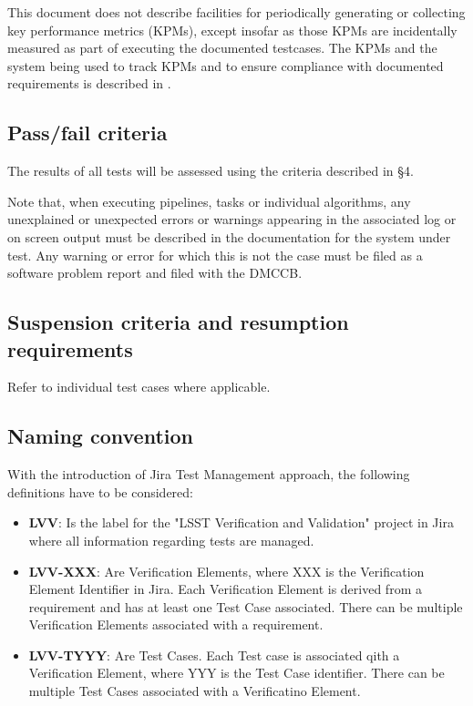 \documentclass[DM,lsstdraft,STS,toc]{lsstdoc}
\begin{document}
This document does not describe facilities for periodically generating or
collecting key performance metrics (KPMs), except insofar as those KPMs are
incidentally measured as part of executing the documented testcases. The KPMs
and the system being used to track KPMs and to ensure compliance with
documented requirements is described in .

\subsection{Pass/fail criteria}
\label{sec:passfail}

The results of all tests will be assessed using the criteria described in
 \S4.

Note that, when executing pipelines, tasks or individual algorithms, any
unexplained or unexpected errors or warnings appearing in the associated log
or on screen output must be described in the documentation for the system
under test. Any warning or error for which this is not the case must be filed
as a software problem report and filed with the DMCCB.

\subsection{Suspension criteria and resumption requirements}
\label{suspension}

Refer to individual test cases where applicable.

\subsection{Naming convention}

With the introduction of Jira Test Management approach, the following definitions
have to be considered:

\begin{itemize}
\item {\bf LVV}: Is the label for the "LSST Verification and Validation" project in Jira where all information regarding tests are managed.
\item {\bf LVV-XXX}: Are Verification Elements, where XXX is the Verification Element Identifier in Jira. 
Each Verification Element is derived from a requirement and has at least one Test Case associated.
There can be multiple Verification Elements associated with a requirement.
\item {\bf LVV-TYYY}: Are Test Cases. Each Test case is associated qith a Verification Element,
where YYY is the Test Case identifier.
There can be multiple Test Cases associated with a Verificatino Element.
\end{itemize}
\end{document}
